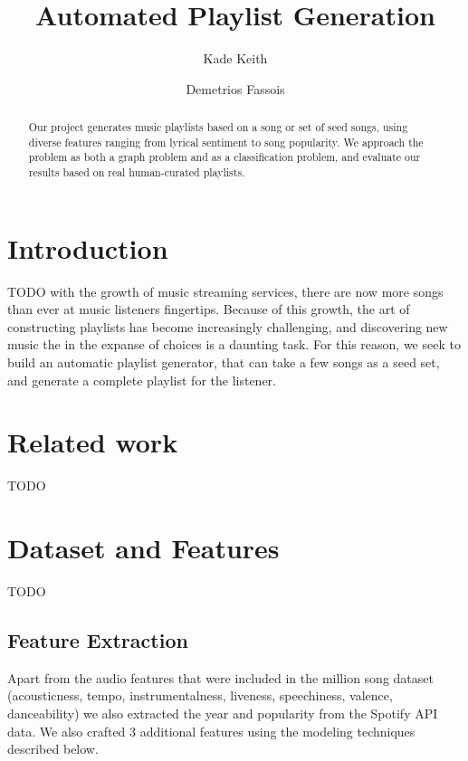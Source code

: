 \documentclass[acmtog]{acmart}
\begin{document}
\title{Automated Playlist Generation}

\author{Kade Keith}
\author{Demetrios Fassois}

\begin{abstract}
Our project generates music playlists based on a song or set of seed songs, using diverse features ranging from lyrical sentiment to song popularity. We approach the problem as both a graph problem and as a classification problem, and evaluate our results based on real human-curated playlists.
\end{abstract}

\maketitle
\thispagestyle{empty}

\section{Introduction}

TODO with the growth of music streaming services, there are now more songs than ever at music listeners fingertips. Because of this growth, the art of constructing playlists has become increasingly challenging, and discovering new music the in the expanse of choices is a daunting task. For this reason, we seek to build an automatic playlist generator, that can take a few songs as a seed set, and generate a complete playlist for the listener.

\section{Related work}

TODO

\section{Dataset and Features}

TODO

\subsection{Feature Extraction}

Apart from the audio features that were included in the million song dataset (acousticness, tempo, instrumentalness, liveness, speechiness, valence, danceability) we also extracted the year and popularity from the Spotify API data. We also crafted 3 additional features using the modeling techniques described below.
\end{document}
